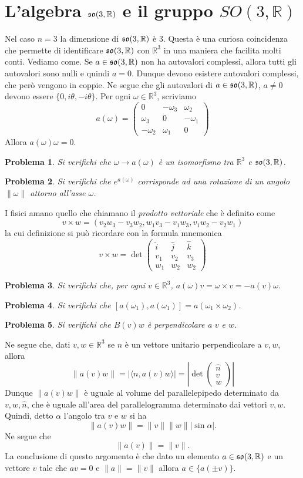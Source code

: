 \documentclass{amsart}
\numberwithin{equation}{section}
\newtheorem{pro}{Problema}
\newcommand\bR{{\mathbb R}}
\newcommand{\lie}{\frak s\frak o}
\begin{document}
\section{L'algebra $\lie(3,\bR)$ e il gruppo $SO(3,\bR)$}
Nel caso $n=3$ la dimensione di $\lie(3,\bR)$ \`e $3$. Questa  \`e  una curiosa coincidenza che permette di identificare $\lie(3,\bR)$ con $\bR^3$ in una maniera che facilita molti conti. Vediamo come. Se $a\in \lie(3,\bR)$ non ha autovalori complessi, allora tutti gli autovalori sono nulli e quindi $a=0$. Dunque devono esistere autovalori complessi, che per\`o vengono in coppie. Ne segue che gli autovalori di $a\in \lie(3,\bR)$, $a\neq 0$ devono essere $\{0, i\theta, -i\theta\}$.  Per ogni $\omega\in\bR^3$, scriviamo
\[
a(\omega)=\begin{pmatrix} 0&-\omega_3&\omega_2\\
\omega_3&0&-\omega_1\\
-\omega_2&\omega_1&0\end{pmatrix}
\]
Allora $a(\omega)\omega=0$.
\begin{pro} Si verifichi che $\omega\to a(\omega)$ \`e un isomorfismo tra $\bR^3$ e $ \lie(3,\bR)$.
\end{pro}
\begin{pro} Si verifichi che $e^{a(\omega)}$ corrisponde ad una rotazione di un angolo $\|\omega\|$ attorno all'asse $\omega$.
\end{pro}
I fisici amano quello che chiamano il {\em prodotto vettoriale} che \`e definito come
\[
v\times w= (v_2 w_3-v_3w_2, w_1v_3-v_1w_3,v_1w_2-v_2w_1)
\] 
la cui definizione si pu\`o ricordare con la formula mnemonica
\[
v\times w=\det\begin{pmatrix}\hat i &\hat j &\hat k\\
v_1& v_2 &v_3\\
w_1& w_2&w_2\end{pmatrix}
\]
\begin{pro} Si verifichi che, per ogni $v\in\bR^3$, $a(\omega)v=\omega\times v=-a(v)\omega$.
\end{pro}
\begin{pro} Si verifichi che $[a(\omega_1),a(\omega_1)]=a(\omega_1\times\omega_2)$.
\end{pro}
\begin{pro} Si verifichi che $B(v)w$ \`e perpendicolare a $v$ e $w$.
\end{pro}
Ne segue che, dati $v,w\in\bR^3$ se $n$ \`e un vettore unitario perpendicolare a $v,w$, allora
\[
\|a(v)w\|=|\langle n, a(v)w\rangle| =\left|\det\begin{pmatrix}\hat n\\
v\\
w\end{pmatrix}\right|
\]
Dunque $\|a(v)w\|$ \`e uguale al volume del parallelepipedo determinato da $v,w,\hat n$, che \`e uguale all'area del  parallelogramma determinato dai vettori $v,w$.
Quindi, detto $\alpha$ l'angolo tra $v$ e $w$ si ha
\[
\|a(v)w\|=\|v\|\|w\| |\sin\alpha|.
\]
Ne segue che
\[
\|a(v)\|=\|v\|.
\]
La conclusione di questo argomento \`e che dato un elemento $a\in\lie(3,\bR)$ e un vettore $v$ tale che $av=0$ e $\|a\|=\|v\|$ allora $a\in\{ a(\pm v)\}$. 
\end{document}

